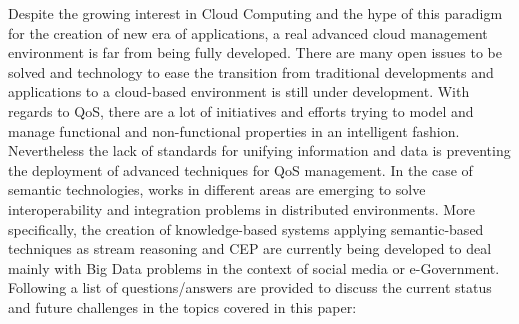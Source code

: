 Despite the growing interest in Cloud Computing and the hype of this 
paradigm for the creation of new era of applications, a real advanced 
cloud management environment is far from being fully developed. There are many open issues 
to be solved and technology to ease the transition from traditional developments and applications 
to a cloud-based environment is still under development. With regards to QoS, 
there are a lot of initiatives and efforts trying to model and manage functional 
and non-functional properties in an intelligent fashion. Nevertheless the lack 
of standards for unifying information and data is preventing the deployment of 
advanced techniques for QoS management. In the case of semantic technologies, 
works in different areas are emerging to solve interoperability and integration 
problems in distributed environments. More specifically, the creation of 
knowledge-based systems applying semantic-based techniques as stream reasoning 
and CEP are currently being developed to deal mainly with Big Data problems in the 
context of social media or e-Government. Following a list of questions/answers 
are provided to discuss the current status and future challenges in the 
topics covered in this paper:
